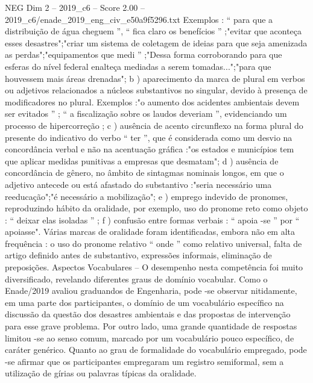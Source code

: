 \begin{textsample}{NEG Dim 2 – 2019\_c6 – Score 2.00 – 2019\_c6/enade\_2019\_eng\_civ\_e50a9f5296.txt}
Exemplos : “ para que a distribuição de água cheguem ”, “ fica claro os benefícios ” ;"evitar que aconteça esses desastres";"criar um sistema de coletagem de ideias para que seja amenizada as perdas";"equipamentos que medi ” ;"Dessa forma corroborando para que esferas do nível federal enalteça mediadas a serem tomadas...";"para que houvessem mais áreas drenadas"; b ) aparecimento da marca de plural em verbos ou adjetivos relacionados a núcleos substantivos no singular, devido à presença de modificadores no plural.
Exemplos :"o aumento dos acidentes ambientais devem ser evitados ” ; “ a fiscalização sobre os laudos deveriam ”, evidenciando um processo de hipercorreção ; c ) ausência de acento circunflexo na forma plural do presente do indicativo do verbo “ ter ”, que é considerada como um desvio na concordância verbal e não na acentuação gráfica :"os estados e municípios tem que aplicar medidas punitivas a empresas que desmatam"; d ) ausência de concordância de gênero, no âmbito de sintagmas nominais longos, em que o adjetivo antecede ou está afastado do substantivo :"seria necessário uma reeducação";"é necessário a mobilização"; e ) emprego indevido de pronomes, reproduzindo hábito da oralidade, por exemplo, uso do pronome reto como objeto : “ deixar elas isoladas ” ; f ) confusão entre formas verbais : “ apoia -se ” por “ apoiasse".
Várias marcas de oralidade foram identificadas, embora não em alta frequência : o uso do pronome relativo “ onde ” como relativo universal, falta de artigo definido antes de substantivo, expressões informais, eliminação de preposições.
Aspectos Vocabulares – O desempenho nesta competência foi muito diversificado, revelando diferentes graus de domínio vocabular.
Como o Enade/2019 avaliou graduandos de Engenharia, pode -se observar nitidamente, em uma parte dos participantes, o domínio de um vocabulário específico na discussão da questão dos desastres ambientais e das propostas de intervenção para esse grave problema.
Por outro lado, uma grande quantidade de respostas limitou -se ao senso comum, marcado por um vocabulário pouco específico, de caráter genérico.
Quanto ao grau de formalidade do vocabulário empregado, pode -se afirmar que os participantes empregaram um registro semiformal, sem a utilização de gírias ou palavras típicas da oralidade.

\end{textsample}
